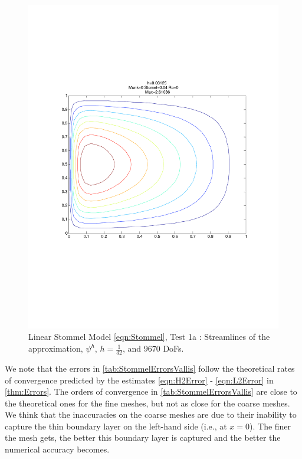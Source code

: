 \begin{figure}%
  \begin{center}
    \includegraphics[trim=0 200 20 220, clip=true, scale=0.5]{LinearStommelVallis.pdf}
    \caption{Linear Stommel Model \eqref{eqn:Stommel}, Test 1a \cite{Vallis06}: Streamlines of the approximation,
    $\psi^h$, $h=\frac{1}{32}$, and $9670$ DoFs.}
    \label{fig:StommelVallis}
  \end{center}
\end{figure}
We note that the errors in \autoref{tab:StommelErrorsVallis} follow the
theoretical rates of convergence predicted by the estimates \eqref{eqn:H2Error}
- \eqref{eqn:L2Error} in \autoref{thm:Errors}. The orders of convergence in
\autoref{tab:StommelErrorsVallis} are close to the theoretical ones for the fine
meshes, but not as close for the coarse meshes. We think that the inaccuracies
on the coarse meshes are due to their inability to capture the thin boundary
layer on the left-hand side (i.e., at $x=0$). The finer the mesh gets, the
better this boundary layer is captured and the better the numerical accuracy
becomes.

